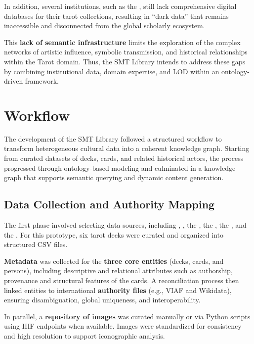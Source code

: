 \documentclass[11pt]{article}
\begin{document}
In addition, several institutions, such as the , still lack comprehensive digital databases for their tarot collections, resulting in “dark data” that remains inaccessible and disconnected from the global scholarly ecosystem.

This \textbf{lack of semantic infrastructure} limits the exploration of the complex networks of artistic influence, symbolic transmission, and historical relationships within the Tarot domain. Thus, the SMT Library intends to address these gaps by combining institutional data, domain expertise, and LOD within an ontology-driven framework.

\section{Workflow}
The development of the SMT Library followed a structured workflow to transform heterogeneous cultural data into a coherent knowledge graph. Starting from curated datasets of decks, cards, and related historical actors, the process progressed through ontology-based modeling and culminated in a knowledge graph that supports semantic querying and dynamic content generation.

\subsection{Data Collection and Authority Mapping}
The first phase involved selecting data sources, including , , the , the , the , and the . For this prototype, six tarot decks were curated and organized into structured CSV files.

\textbf{Metadata} was collected for the \textbf{three core entities} (decks, cards, and persons), including descriptive and relational attributes such as authorship, provenance and structural features of the cards. A reconciliation process then linked entities to international \textbf{authority files} (e.g., VIAF and Wikidata), ensuring disambiguation, global uniqueness, and interoperability.

In parallel, a \textbf{repository of images} was curated manually or via Python scripts using IIIF endpoints when available. Images were standardized for consistency and high resolution to support iconographic analysis.
\end{document}
